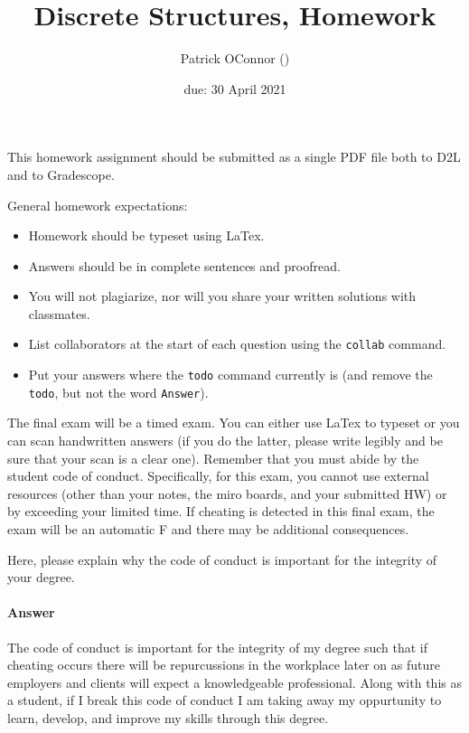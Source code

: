 \documentclass{article}
\title{Discrete Structures, Homework \hwnum}
\author{Patrick OConnor (\todo{your discord handle here})}
\date{due: 30 April 2021}
\begin{document}
\maketitle

This homework assignment should be
submitted as a single PDF file both to D2L and to Gradescope.

General homework expectations:
\begin{itemize}
    \item Homework should be typeset using LaTex.
    \item Answers should be in complete sentences and proofread.
    \item You will not plagiarize, nor will you share your written solutions
        with classmates.
    \item List collaborators at the start of each question using the \texttt{collab} command.
    \item Put your answers where the \texttt{todo} command currently is (and
        remove the \texttt{todo}, but not the word \texttt{Answer}).
\end{itemize}


 

The final exam will be a timed exam.  You can either use LaTex to typeset or you
can scan handwritten answers (if you do the latter, please write legibly and be
sure that your scan is a clear one).  Remember that you must abide by the
student code of conduct.  Specifically, for this exam, you cannot use external
resources (other than your notes, the miro boards, and your submitted HW) or by
exceeding your limited time.  If cheating is detected in this final exam, the
exam will be an automatic F and there may be additional consequences.

Here, please explain why the code of conduct is important for the integrity of
your degree.

\paragraph{Answer}

The code of conduct is important for the integrity of my degree such that if cheating occurs there will 
be repurcussions in the workplace later on as future employers and clients will expect a knowledgeable professional.
Along with this as a student, if I break this code of conduct I am taking away my oppurtunity to learn, develop, and 
improve my skills through this degree. 
\end{document}
